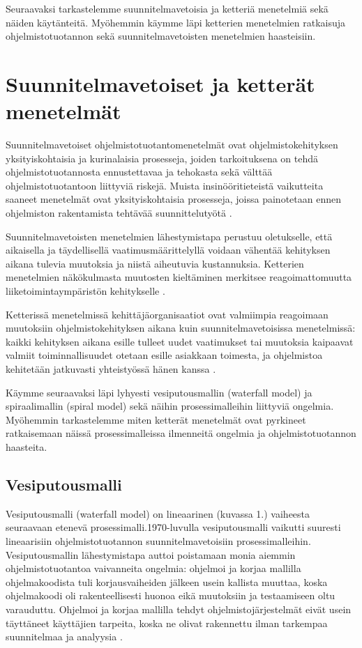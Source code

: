 \documentclass[finnish]{tktltiki2}
\theoremstyle{definition}
\theoremstyle{remark}
\begin{document}
Seuraavaksi tarkastelemme suunnitelmavetoisia ja ketteriä menetelmiä sekä näiden käytänteitä. Myöhemmin käymme läpi ketterien menetelmien ratkaisuja ohjelmistotuotannon sekä suunnitelmavetoisten menetelmien haasteisiin.

\section{Suunnitelmavetoiset ja ketterät menetelmät}

Suunnitelmavetoiset ohjelmistotuotantomenetelmät ovat ohjelmistokehityksen yksityiskohtaisia ja kurinalaisia prosesseja, joiden tarkoituksena on tehdä ohjelmistotuotannosta ennustettavaa ja tehokasta sekä välttää ohjelmistotuotantoon liittyviä riskejä. Muista insinööritieteistä vaikutteita saaneet menetelmät ovat yksityiskohtaisia prosesseja, joissa painotetaan ennen ohjelmiston rakentamista tehtävää suunnittelutyötä \cite{FOW01a}.

Suunnitelmavetoisten menetelmien lähestymistapa perustuu oletukselle, että aikaisella ja täydellisellä vaatimusmäärittelyllä voidaan vähentää kehityksen aikana tulevia muutoksia ja niistä aiheutuvia kustannuksia. Ketterien menetelmien näkökulmasta muutosten kieltäminen merkitsee reagoimattomuutta liiketoimintaympäristön kehitykselle \cite{HIC01}.

Ketterissä menetelmissä kehittäjäorganisaatiot ovat valmiimpia reagoimaan muutoksiin ohjelmistokehityksen aikana kuin suunnitelmavetoisissa menetelmissä: kaikki kehityksen aikana esille tulleet uudet vaatimukset tai muutoksia kaipaavat valmiit toiminnallisuudet otetaan esille asiakkaan toimesta, ja ohjelmistoa kehitetään jatkuvasti yhteistyössä hänen kanssa \cite{WIC03}.

Käymme seuraavaksi läpi lyhyesti vesiputousmallin (waterfall model) ja spiraalimallin (spiral model) sekä näihin prosessimalleihin liittyviä ongelmia. Myöhemmin tarkastelemme miten ketterät menetelmät ovat pyrkineet ratkaisemaan näissä prosessimalleissa ilmenneitä ongelmia ja ohjelmistotuotannon haasteita.

\subsection{Vesiputousmalli}

Vesiputousmalli (waterfall model) on lineaarinen (kuvassa 1.) vaiheesta seuraavaan etenevä prosessimalli.1970-luvulla vesiputousmalli vaikutti suuresti lineaarisiin ohjelmistotuotannon suunnitelmavetoisiin prosessimalleihin. Vesiputousmallin lähestymistapa auttoi poistamaan monia aiemmin ohjelmistotuotantoa vaivanneita ongelmia: ohjelmoi ja korjaa mallilla ohjelmakoodista tuli korjausvaiheiden jälkeen usein kallista muuttaa, koska ohjelmakoodi oli rakenteellisesti huonoa eikä muutoksiin ja testaamiseen oltu varauduttu. Ohjelmoi ja korjaa mallilla tehdyt ohjelmistojärjestelmät eivät usein täyttäneet käyttäjien tarpeita, koska ne olivat rakennettu ilman tarkempaa suunnitelmaa ja analyysia \cite{BOE88}.
\end{document}
